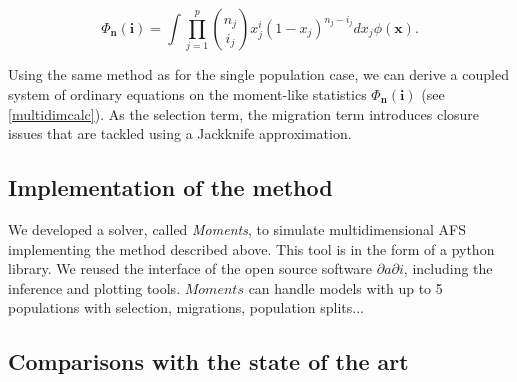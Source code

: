 \begin{equation}
\Phi_{\mathbf{n}}(\mathbf{i})= \int \prod_{j=1}^p { n_j \choose i_j} x_j^i (1-x_j)^{n_j-i_j} dx_j \phi(\mathbf{x}).
\label{eq:Phinp}
\end{equation}

Using the same method as for the single population case, we can derive a coupled system of ordinary equations on the moment-like statistics $\Phi_{\mathbf{n}}(\mathbf{i})$ (see \ref{multidimcalc}). As the selection term, the migration term introduces closure issues that are tackled using a Jackknife approximation.

\subsection{Implementation of the method}
We developed a solver, called \textit{Moments}, to simulate multidimensional AFS implementing the method described above. This tool is in the form of a python library. We reused the interface of the open source software $\partial a \partial i$, including the inference and plotting tools. $Moments$ can handle models with up to 5 populations with selection, migrations, population splits...

\subsection{Comparisons with the state of the art}
